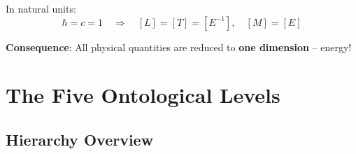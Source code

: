 	In natural units:
	\begin{equation}
		\hbar = c = 1 \quad \Rightarrow \quad [L] = [T] = [E^{-1}], \quad [M] = [E]
	\end{equation}
	
	\textbf{Consequence}: All physical quantities are reduced to \textbf{one dimension} -- energy!
	
	\begin{table}[H]
		\centering
		\caption{Dimensional reduction in natural units}
	\end{table}
	
	\section{The Five Ontological Levels}
	
	\subsection{Hierarchy Overview}
	
